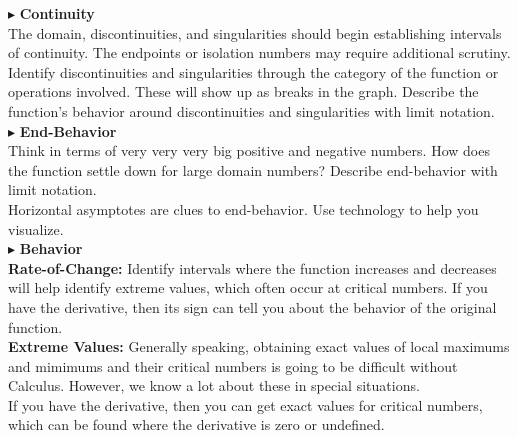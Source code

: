 \documentclass{ximera}
\begin{document}
$\blacktriangleright$ \textbf{\textcolor{red!10!blue!90!}{Continuity}} \\
The domain, discontinuities, and singularities should begin establishing intervals of continuity.  The endpoints or isolation numbers may require additional scrutiny.  \\


Identify discontinuities and singularities through the category of the function or operations involved.  These will show up as breaks in the graph. Describe the function's behavior around discontinuities and singularities with limit notation.\\








$\blacktriangleright$ \textbf{\textcolor{red!10!blue!90!}{End-Behavior}} \\
Think in terms of very very very big positive and negative numbers.  How does the function settle down for large domain numbers?  Describe end-behavior with limit notation. \\

Horizontal asymptotes are clues to end-behavior. Use technology to help you visualize.\\






$\blacktriangleright$ \textbf{\textcolor{red!10!blue!90!}{Behavior}} \\

\textbf{Rate-of-Change:} Identify intervals where the function increases and decreases will help identify extreme values, which often occur at critical numbers.  If you have the derivative, then its sign can tell you about the behavior of the original function.\\


\textbf{Extreme Values:}
Generally speaking, obtaining exact values of local maximums and mimimums and their critical numbers is going to be difficult without Calculus.  However, we know a lot about these in special situations. \\

If you have the derivative, then you can get exact values for critical numbers, which can be found where the derivative is zero or undefined. \\
\end{document}
